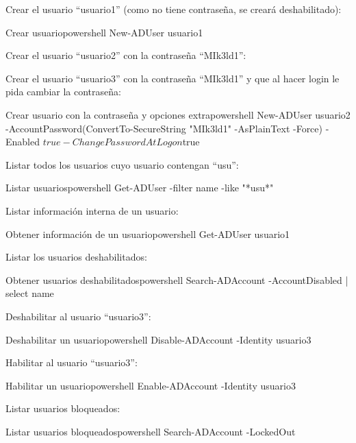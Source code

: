 Crear el usuario “usuario1” (como no tiene contraseña, se creará deshabilitado):
\begin{mycode}{Crear usuario}{powershell}{}
New-ADUser usuario1
\end{mycode}

Crear el usuario “usuario2” con la contraseña “MIk3ld1”:

Crear el usuario “usuario3” con la contraseña “MIk3ld1” y que al hacer login le pida cambiar la contraseña:
\begin{mycode}{Crear usuario con la contraseña y opciones extra}{powershell}{}
New-ADUser usuario2 -AccountPassword(ConvertTo-SecureString "MIk3ld1"
-AsPlainText -Force) -Enabled $true -ChangePasswordAtLogon $true
\end{mycode}

Listar todos los usuarios cuyo usuario contengan “usu”:
\begin{mycode}{Listar usuarios}{powershell}{}
Get-ADUser -filter {name -like "*usu*"}
\end{mycode}

Listar información interna de un usuario:
\begin{mycode}{Obtener información de un usuario}{powershell}{}
Get-ADUser usuario1
\end{mycode}

Listar los  usuarios deshabilitados:
\begin{mycode}{Obtener usuarios deshabilitados}{powershell}{}
Search-ADAccount -AccountDisabled | select name
\end{mycode}

Deshabilitar al usuario “usuario3”:
\begin{mycode}{Deshabilitar un usuario}{powershell}{}
Disable-ADAccount -Identity usuario3
\end{mycode}


Habilitar al usuario “usuario3”:
\begin{mycode}{Habilitar un usuario}{powershell}{}
Enable-ADAccount -Identity usuario3
\end{mycode}

Listar usuarios bloqueados:
\begin{mycode}{Listar usuarios bloqueados}{powershell}{}
Search-ADAccount -LockedOut
\end{mycode}


